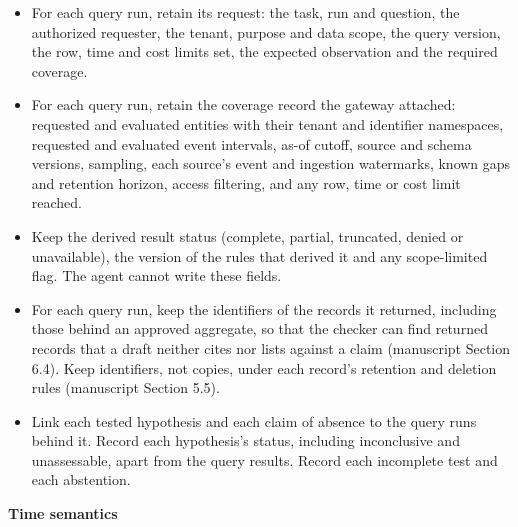 \documentclass[
  11pt,
]{article}
\providecommand{\tightlist}{%
  \setlength{\itemsep}{0pt}\setlength{\parskip}{0pt}}
\renewcommand{\tightlist}{\setlength{\itemsep}{0pt plus 1pt}\setlength{\parskip}{0pt}}
\begin{document}
\begin{itemize}
\tightlist
\item
  For each query run, retain its request: the task, run and question,
  the authorized requester, the tenant, purpose and data scope, the
  query version, the row, time and cost limits set, the expected
  observation and the required coverage.
\item
  For each query run, retain the coverage record the gateway attached:
  requested and evaluated entities with their tenant and identifier
  namespaces, requested and evaluated event intervals, as-of cutoff,
  source and schema versions, sampling, each source's event and
  ingestion watermarks, known gaps and retention horizon, access
  filtering, and any row, time or cost limit reached.
\item
  Keep the derived result status (complete, partial, truncated, denied
  or unavailable), the version of the rules that derived it and any
  scope-limited flag. The agent cannot write these fields.
\item
  For each query run, keep the identifiers of the records it returned,
  including those behind an approved aggregate, so that the checker can
  find returned records that a draft neither cites nor lists against a
  claim (manuscript Section 6.4). Keep identifiers, not copies, under
  each record's retention and deletion rules (manuscript Section 5.5).
\item
  Link each tested hypothesis and each claim of absence to the query
  runs behind it. Record each hypothesis's status, including
  inconclusive and unassessable, apart from the query results. Record
  each incomplete test and each abstention.
\end{itemize}


\textbf{Time semantics}
\end{document}
